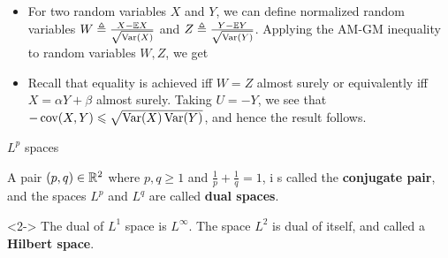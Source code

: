 \documentclass[12pt,aspectratio=169]{beamer}
\begin{document}
\begin{frame}
\begin{Proof} 
\begin{itemize}
\item <1-> For two random variables $X$ and $Y$, we can define normalized random variables $W \triangleq \frac{X-\mathbb{E} X}{\sqrt{\operatorname{Var}(X)}}$ and $Z \triangleq \frac{Y-\mathbb{E} Y}{\sqrt{\operatorname{Var}(Y)}}$. 
Applying the AM-GM inequality to random variables $W, Z$, we get 
\item <2-> Recall that equality is achieved iff $W = Z$ almost surely or equivalently iff $X = \alpha Y + \beta$ almost surely.  
Taking $U = -Y$, we see that $-\operatorname{cov}(X,Y) \leqslant \sqrt{\operatorname{Var}(X)\operatorname{Var}(Y)}$, and hence the result follows.
\end{itemize}
\end{Proof}
\end{frame}


\begin{frame}{$L^p$ spaces}



\begin{Definition}
A pair $(p,q) \in \mathbb{R}^2$ where $p, q \ge 1$ and $\frac{1}{p}+\frac{1}{q} = 1$, i
s called the \textbf{conjugate pair}, 
and the spaces $L^p$ and $L^q$ are called \textbf{dual spaces}. 
\end{Definition}


\begin{Example}<2->
The dual of $L^1$ space is $L^\infty$. 
The space $L^2$ is dual of itself, and called a \textbf{Hilbert space}. 
\end{Example}
\end{frame}
\end{document}
